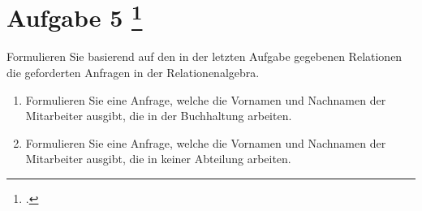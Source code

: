 \documentclass{lehramt-informatik-aufgabe}
\begin{document}
\section{Aufgabe 5
\footcite{66116:2021:03}}

Formulieren Sie basierend auf den in der letzten Aufgabe gegebenen
Relationen die geforderten Anfragen in der Relationenalgebra.

\begin{enumerate}


\item Formulieren Sie eine Anfrage, welche die Vornamen und Nachnamen
der Mitarbeiter ausgibt, die in der Buchhaltung arbeiten.


\item Formulieren Sie eine Anfrage, welche die Vornamen und Nachnamen
der Mitarbeiter ausgibt, die in keiner Abteilung arbeiten.
\end{enumerate}
\end{document}
